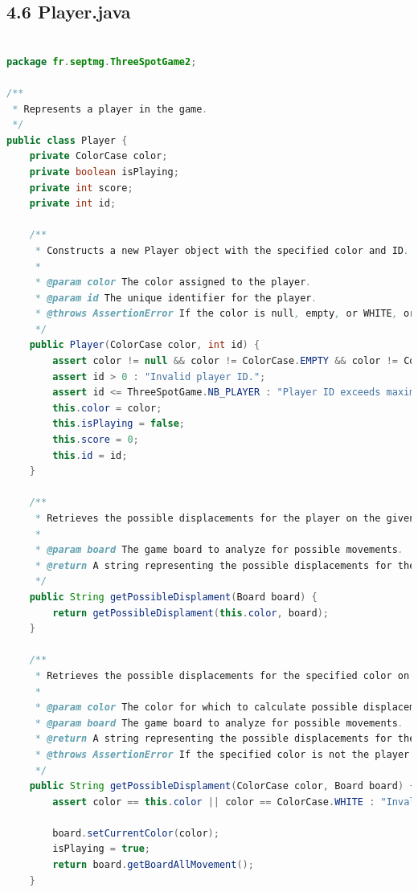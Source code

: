 \documentclass[a4paper,11pt]{article}
\begin{document}
\subsection{4.6 Player.java}

\begin{lstlisting}[language=Java, breaklines=true]

package fr.septmg.ThreeSpotGame2;

/**
 * Represents a player in the game.
 */
public class Player {
    private ColorCase color;
    private boolean isPlaying;
    private int score;
    private int id;

    /**
     * Constructs a new Player object with the specified color and ID.
     *
     * @param color The color assigned to the player.
     * @param id The unique identifier for the player.
     * @throws AssertionError If the color is null, empty, or WHITE, or if the ID is not positive or exceeds the maximum number of players.
     */
    public Player(ColorCase color, int id) {
        assert color != null && color != ColorCase.EMPTY && color != ColorCase.WHITE : "Invalid color for player.";
        assert id > 0 : "Invalid player ID.";
        assert id <= ThreeSpotGame.NB_PLAYER : "Player ID exceeds maximum number of players.";
        this.color = color;
        this.isPlaying = false;
        this.score = 0;
        this.id = id;
    }

    /**
     * Retrieves the possible displacements for the player on the given board.
     *
     * @param board The game board to analyze for possible movements.
     * @return A string representing the possible displacements for the player on the board.
     */
    public String getPossibleDisplament(Board board) {
        return getPossibleDisplament(this.color, board);
    }

    /**
     * Retrieves the possible displacements for the specified color on the given board.
     *
     * @param color The color for which to calculate possible displacements.
     * @param board The game board to analyze for possible movements.
     * @return A string representing the possible displacements for the specified color on the board.
     * @throws AssertionError If the specified color is not the player's color or WHITE.
     */
    public String getPossibleDisplament(ColorCase color, Board board) {
        assert color == this.color || color == ColorCase.WHITE : "Invalid color for player.";

        board.setCurrentColor(color);
        isPlaying = true;
        return board.getBoardAllMovement();
    }


\end{lstlisting}
\end{document}

